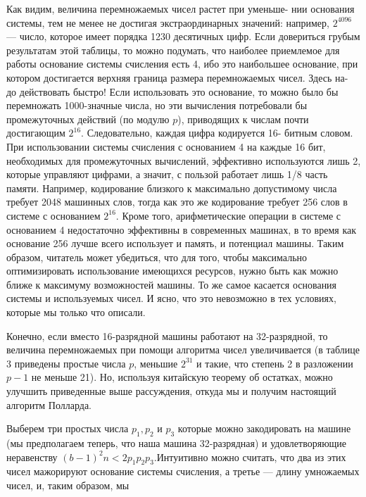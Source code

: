 Как видим, величина перемножаемых чисел растет при уменьше-\linebreak
нии основания системы, тем не менее не достигая экстраординарных\linebreak
значений: например, $2^{4096}$ --- число, которое имеет порядка 1230 десятичных цифр. Если довериться грубым результатам этой таблицы, то \linebreak
можно подумать, что наиболее приемлемое для работы основание системы счисления есть 4, ибо это наибольшее основание, при котором достигается верхняя граница размера перемножаемых чисел. Здесь на- \linebreak
\pagebreak
\newpage
\noindent до действовать быстро! Если использовать это основание, то можно
было бы перемножать 1000-значные числа, но эти вычисления 
потребовали бы промежуточных действий (по модулю $p$), приводящих к числам
почти достигающим $2^{16}$. Следовательно, каждая цифра кодируется 16-
битным словом. При использовании системы счисления с основанием
4 на каждые 16 бит, необходимых для промежуточных вычислений,
эффективно используются лишь 2, которые управляют цифрами, а 
значит, с пользой работает лишь 1/8 часть памяти. Например, 
кодирование близкого к максимально допустимому числа требует 2048 
машинных слов, тогда как это же кодирование требует 256 слов в системе
с основанием $2^{16}$. Кроме того, арифметические операции в системе с
основанием 4 недостаточно эффективны в современных машинах, в то
время как основание 256 лучше всего использует и память, и потенциал
машины. Таким образом, читатель может убедиться, что для того, 
чтобы максимально оптимизировать использование имеющихся ресурсов,
нужно быть как можно ближе к максимуму возможностей машины. То
же самое касается основания системы и используемых чисел. И ясно,
что это невозможно в тех условиях, которые мы только что описали.\par
  Конечно, если вместо 16-разрядной машины работают на 
32-разрядной, то величина перемножаемых при помощи алгоритма чисел 
увеличивается (в таблице 3 приведены простые числа $p$, меньшие $2^{31}$ и
такие, что степень 2 в разложении $p - 1$ не меньше 21). Но, используя
китайскую теорему об остатках, можно улучшить приведенные выше
рассуждения, откуда мы и получим настоящий алгоритм Полларда.\par
 Выберем три простых числа $p_{1}, p_{2}$ и $p_{3}$ которые можно 
закодировать на машине (мы предполагаем теперь, что наша машина 
32-разрядная) и удовлетворяющие неравенству $(b - 1)^{2}n < 2p_{1}p_{2}p_{3}$.Интуитивно можно считать, что два из этих чисел мажорируют основание системы счисления, а третье --- длину умножаемых чисел, и, таким образом, мы

